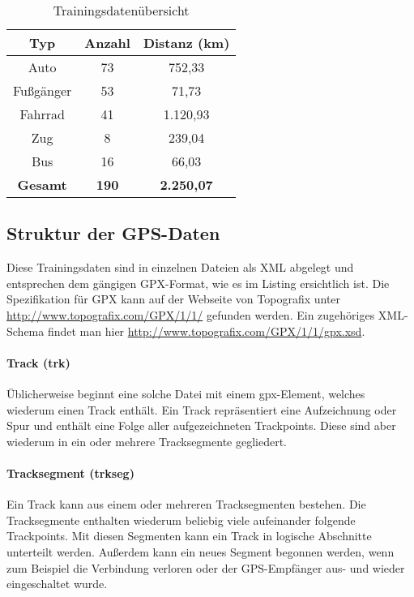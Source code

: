 \begin{table}
\centering
\begin{tabular}{| c | c | c | }
\hline
\textbf{Typ} & \textbf{Anzahl} & \textbf{Distanz (km)}\\ 
\hline
Auto & 73 & 752,33\\
\hline
Fußgänger &	53 & 71,73\\
\hline
Fahrrad	& 41 & 1.120,93\\
\hline
Zug & 8 & 239,04\\
\hline
Bus	& 16 & 66,03\\
\hline
\textbf{Gesamt} & \textbf{190} & \textbf{2.250,07}\\
\hline
\end{tabular}
\caption{Trainingsdatenübersicht}
\label{datenuebsicht}
\end{table}

\subsection{Struktur der GPS-Daten}
Diese Trainingsdaten sind in einzelnen Dateien als XML abgelegt und entsprechen dem gängigen GPX-Format, wie es im Listing  ersichtlich ist. Die Spezifikation für GPX kann auf der Webseite von Topografix unter \url{ http://www.topografix.com/GPX/1/1/} gefunden werden. Ein zugehöriges XML-Schema findet man hier \url{http://www.topografix.com/GPX/1/1/gpx.xsd}. \cite{topografix_gpx_2004} 

\paragraph{Track (trk)}
Üblicherweise beginnt eine solche Datei mit einem gpx-Element, welches wiederum einen Track enthält. Ein Track repräsentiert eine Aufzeichnung oder Spur und enthält eine Folge aller aufgezeichneten Trackpoints. Diese sind aber wiederum in ein oder mehrere Tracksegmente gegliedert.

\paragraph{Tracksegment (trkseg)}
Ein Track kann aus einem oder mehreren Tracksegmenten bestehen. Die Tracksegmente enthalten wiederum beliebig viele aufeinander folgende Trackpoints. Mit diesen Segmenten kann ein Track in logische Abschnitte unterteilt werden. Außerdem kann ein neues Segment begonnen werden, wenn zum Beispiel die Verbindung verloren oder der GPS-Empfänger aus- und wieder eingeschaltet wurde.

